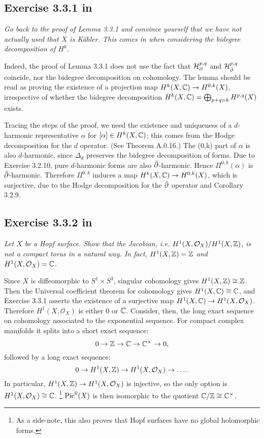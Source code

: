 \documentclass{article}
\begin{document}
\subsection*{Exercise 3.3.1 in \cite{Huy}}
\emph{Go back to the proof of Lemma 3.3.1 and convince yourself that we have
not actually used that $X$ is K\"{a}hler. This comes in when considering the bidegree
decomposition of $H^k$.}
\vspace{3mm}

Indeed, the proof of Lemma 3.3.1 does not use the fact that $\mathcal{H}_{\partial}^{p,q}$ and $\mathcal{H}_{\bar {\partial}}^{p,q}$
coincide, nor the bidegree decomposition on cohomology. The lemma should be read as proving the existence of a projection map
$H^k(X,\mathbb{C}) \to H^{0,k}(X)$, irrespective of whether the bidegree decomposition $H^k(X,\mathbb{C}) = \bigoplus_{p+q = k} H^{p,q}(X)$
exists.

Tracing the steps of the proof, we need the existence and uniqueness of a $d$-harmonic representative $\alpha$ for $[\alpha]
\in H^k(X,\mathbb{C})$; this comes from the Hodge decomposition for the $d$ operator. (See Theorem A.0.16.) The (0,k) 
part of $\alpha$ is also $d$-harmonic, since $\Delta_d$ preserves the bidegree decomposition of forms. Due to
Exercise 3.2.10, pure $d$-harmonic forms are also $\bar {\partial}$-harmonic. Hence $\Pi^{0,k}(\alpha)$ is $\bar {\partial}$-harmonic.
Therefore $\Pi^{0,k}$ induces a map $H^k(X,\mathbb{C}) \to H^{0,k}(X)$, which is surjective, due to the Hodge decomposition for the
$\bar {\partial}$ operator and Corollary 3.2.9.


\subsection*{Exercise 3.3.2 in \cite{Huy}}
\emph{Let $X$ be a Hopf surface. Show that the Jacobian, i.e. $H^1(X, \mathcal{O}_X)/H^1(X, \mathbb{Z})$,
is not a compact torus in a natural way. In fact, $H^1(X, \mathbb{Z}) = \mathbb{Z}$ and $H^1(X, \mathcal{O}_X) = \mathbb{C}$.}
\vspace{3mm}

Since $X$ is diffeomorphic to $S^1 \times S^3$, singular cohomology gives $H^1(X,\mathbb{Z}) \cong \mathbb{Z}$. Then the
Universal coefficient theorem for cohomology gives $H^1(X,\mathbb{C}) \cong \mathbb{C}$, and Exercise 3.3.1 asserts the existence
of a surjective map $H^1(X,\mathbb{C}) \to H^1(X,\mathcal{O}_X)$. Therefore $H^1(X,\mathcal{O}_X)$ is either $0$ or $\mathbb{C}$.
Consider, then, the long exact sequence on cohomology associated to the exponential sequence. For compact
complex manifolds it splits into a short
exact sequence:
\[	0 \to \mathbb{Z} \to \mathbb{C} \to \mathbb{C}^{\times} \to 0,	\]
followed by a long exact sequence:
\[	0 \to H^1(X,\mathbb{Z}) \to H^1(X,\mathcal{O}_X) \to \dots.	\]
In particular, $H^1(X,\mathbb{Z}) \to H^1(X,\mathcal{O}_X)$ is injective, so the only option is $H^1(X,\mathcal{O}_X) \cong \mathbb{C}$.
\footnote{As a side-note, this also proves that Hopf surfaces have no global holomorphic forms.}
$\operatorname{Pic}^0(X)$ is then isomorphic to the quotient $\mathbb{C}/\mathbb{Z} \cong \mathbb{C}^{\times}$.
\end{document}
